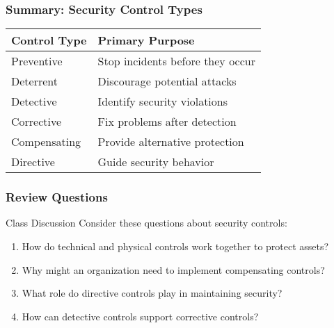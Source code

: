 \documentclass{beamer}
\begin{document}
\begin{frame}
    \frametitle{Summary: Security Control Types}
    
    \begin{table}
        \begin{tabular}{|l|l|}
            \hline
            \textbf{Control Type} & \textbf{Primary Purpose} \\
            \hline
            Preventive & Stop incidents before they occur \\
            Deterrent & Discourage potential attacks \\
            Detective & Identify security violations \\
            Corrective & Fix problems after detection \\
            Compensating & Provide alternative protection \\
            Directive & Guide security behavior \\
            \hline
        \end{tabular}
    \end{table}
\end{frame}

\begin{frame}
    \frametitle{Review Questions}
    
    \begin{block}{Class Discussion}
        Consider these questions about security controls:
        
        \begin{enumerate}
            \item How do technical and physical controls work together to protect assets?
            
            \item Why might an organization need to implement compensating controls?
            
            \item What role do directive controls play in maintaining security?
            
            \item How can detective controls support corrective controls?
        \end{enumerate}
    \end{block}
\end{frame}
\end{document}
